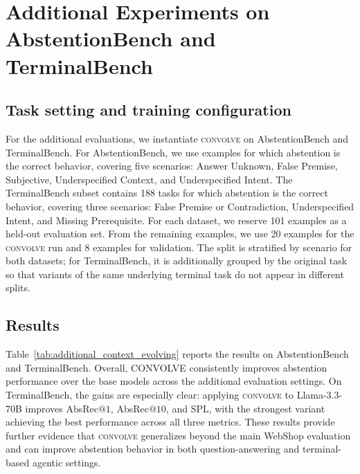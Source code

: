 \documentclass{llmxive}
\providecommand{\method}{\textsc{convolve}\xspace}
\begin{document}
\section{Additional Experiments on AbstentionBench and TerminalBench}
\label{app:additional_experiments}

\subsection{Task setting and training configuration}

For the additional evaluations, we instantiate \method on AbstentionBench and TerminalBench. For AbstentionBench, we use examples for which abstention is the correct behavior, covering five scenarios: Answer Unknown, False Premise, Subjective, Underspecified Context, and Underspecified Intent. The TerminalBench subset contains 188 tasks for which abstention is the correct behavior, covering three scenarios: False Premise or Contradiction, Underspecified Intent, and Missing Prerequisite. For each dataset, we reserve 101 examples as a held-out evaluation set. From the remaining examples, we use 20 examples for the \method run and 8 examples for validation. The split is stratified by scenario for both datasets; for TerminalBench, it is additionally grouped by the original task so that variants of the same underlying terminal task do not appear in different splits.


\subsection{Results}

Table~\ref{tab:additional_context_evolving} reports the results on AbstentionBench and TerminalBench. Overall, CONVOLVE consistently improves abstention performance over the base models across the additional evaluation settings. On TerminalBench, the gains are especially clear: applying \method to Llama-3.3-70B improves AbsRec$@1$, AbsRec$@10$, and SPL, with the strongest variant achieving the best performance across all three metrics. These results provide further evidence that \method generalizes beyond the main WebShop evaluation and can improve abstention behavior in both question-answering and terminal-based agentic settings.
\end{document}
